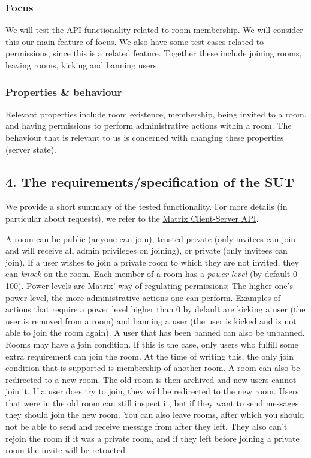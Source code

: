 \documentclass{article}
\begin{document}
\subsubsection*{Focus}
We will test the API functionality related to room membership. We will consider this our main feature of focus.
We also have some test cases related to permissions, since this is a related feature.
Together these include joining rooms, leaving rooms, kicking and banning users.

\subsubsection*{Properties \& behaviour}
Relevant properties include room existence, membership, being invited to a room, and having permissions to perform administrative actions within a room. The behaviour that is relevant to us is concerned with changing these properties (server state).

\subsection*{4. The requirements/specification of the SUT}
We provide a short summary of the tested functionality. For more details (in particular about requests), we refer to the \href{https://spec.matrix.org/latest/client-server-api/#joining-rooms}{Matrix Client-Server API}.

A room can be public (anyone can join), trusted private (only invitees can join and will receive all admin privileges on joining), or private (only invitees can join).
If a user wishes to join a private room to which they are not invited, they can \textit{knock} on the room. 
Each member of a room has a \textit{power level} (by default 0-100). Power levels are Matrix' way of regulating permissions; 
The higher one's power level, the more administrative actions one can perform. Examples of actions that require a power level higher than 0 by default are kicking a user (the user is removed from a room) and banning a user (the user is kicked and is not able to join the room again). A user that has been banned can also be unbanned.
Rooms may have a join condition. If this is the case, only users who fulfill some extra requirement can join the room. 
At the time of writing this, the only join condition that is supported is membership of another room. A room can also be redirected to a new room. The old room is then archived and new users cannot join it. If a user does try to join, they will be redirected to the new room. Users that were in the old room can still inspect it, but if they want to send messages they should join the new room. You can also leave rooms, after which you should not be able to send and receive message from after they left. They also can't rejoin the room if it was a private room, and if they left before joining a private room the invite will be retracted.
\end{document}
